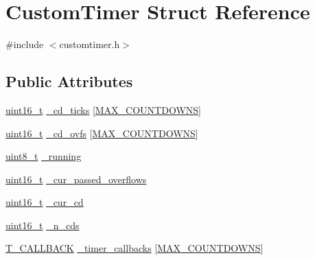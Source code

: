 \hypertarget{structCustomTimer}{\section{Custom\-Timer Struct Reference}
\label{structCustomTimer}
}


{\ttfamily \#include $<$customtimer.\-h$>$}

\subsection*{Public Attributes}
\begin{DoxyCompactItemize}
\item 
\hyperlink{test_8h_aa93ac051f2256663466253286bfef785}{uint16\-\_\-t} \hyperlink{structCustomTimer_ae0684ad120aeca74d5b9346e214e8320}{\-\_\-cd\-\_\-ticks} \mbox{[}\hyperlink{customtimer_8h_aa856fcb7aee41aa2cdd570d9472fa2a5}{M\-A\-X\-\_\-\-C\-O\-U\-N\-T\-D\-O\-W\-N\-S}\mbox{]}
\item 
\hyperlink{test_8h_aa93ac051f2256663466253286bfef785}{uint16\-\_\-t} \hyperlink{structCustomTimer_aaedf2c0761d3a5c5f0fc620b8ff3066b}{\-\_\-cd\-\_\-ovfs} \mbox{[}\hyperlink{customtimer_8h_aa856fcb7aee41aa2cdd570d9472fa2a5}{M\-A\-X\-\_\-\-C\-O\-U\-N\-T\-D\-O\-W\-N\-S}\mbox{]}
\item 
\hyperlink{test_8h_aba7bc1797add20fe3efdf37ced1182c5}{uint8\-\_\-t} \hyperlink{structCustomTimer_a8812f98379da20ef638a8f4e3e2986e8}{\-\_\-running}
\item 
\hyperlink{test_8h_aa93ac051f2256663466253286bfef785}{uint16\-\_\-t} \hyperlink{structCustomTimer_ad15fa895447acab30d432060384580da}{\-\_\-cur\-\_\-passed\-\_\-overflows}
\item 
\hyperlink{test_8h_aa93ac051f2256663466253286bfef785}{uint16\-\_\-t} \hyperlink{structCustomTimer_a09300946b38b86d97fb0b156ef2cc4b2}{\-\_\-cur\-\_\-cd}
\item 
\hyperlink{test_8h_aa93ac051f2256663466253286bfef785}{uint16\-\_\-t} \hyperlink{structCustomTimer_a62c65f1d0a0d390f50345ecd0f9a7271}{\-\_\-n\-\_\-cds}
\item 
\hyperlink{customtimer_8h_ad3a17d16a861e5cdc4f4af2ed19fa407}{T\-\_\-\-C\-A\-L\-L\-B\-A\-C\-K} \hyperlink{structCustomTimer_a50e4108790b76dc45bdc008ee86dd94c}{\-\_\-timer\-\_\-callbacks} \mbox{[}\hyperlink{customtimer_8h_aa856fcb7aee41aa2cdd570d9472fa2a5}{M\-A\-X\-\_\-\-C\-O\-U\-N\-T\-D\-O\-W\-N\-S}\mbox{]}
\end{DoxyCompactItemize}


